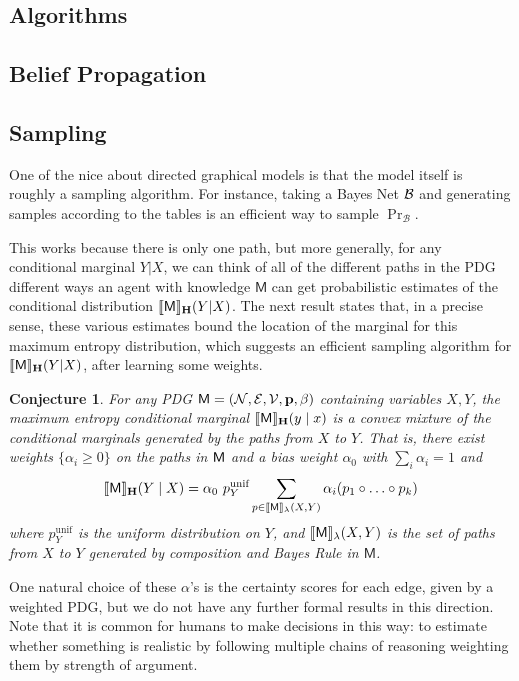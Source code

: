 \documentclass{article}
\theoremstyle{plain}
\newtheorem{conj}[theorem]{Conjecture}
\theoremstyle{definition}
\theoremstyle{remark}
\DeclarePairedDelimiter{\bbr}{\llbracket}{\rrbracket}
\newcommand\MaxEnt{_{\mathbf H}}
\newcommand{\sfM}{\mathsf M}
\newcommand{\MN}{PDG}
\numberwithin{equation}{section}
\begin{document}
	\begin{vfull}
	\section{Algorithms}\label{sec:algorithms}
	\subsection{Belief Propagation}
	
	
	\subsection{Sampling}
	
	One of the nice about directed graphical models is that the model itself is roughly a sampling algorithm. For instance, taking a Bayes Net $\cal B$ and generating samples according to the tables is an efficient way to sample $\Pr_{\mathcal B}$.

	This works because there is only one path, but more generally, for any conditional marginal $Y|X$, we can think of all of the different paths in the PDG different ways an agent with knowledge $\sfM$ can get probabilistic estimates of the conditional distribution $\bbr{\sfM}\MaxEnt(Y | X)$. The next result states that, in a precise sense, these various estimates bound the location of the marginal for this maximum entropy distribution, which suggests an efficient sampling algorithm for $\bbr{\sfM}\MaxEnt(Y | X)$, after learning some weights.
	
	\begin{conj}\label{thm:maxent-hull}
		For any PDG $\sfM = \mnvars[]$ containing variables $X, Y$, the maximum entropy conditional marginal $\bbr{\sfM}\MaxEnt(y \mid x)$ is a convex mixture of the conditional marginals generated by the paths from $X$ to $Y$.  That is, there exist weights $\{\alpha_i \geq 0\}$ on the paths in $\sf M$ and a bias weight $\alpha_0$ with $\sum_i {\alpha_i} = 1$ and
		\[ \bbr{\sfM}\MaxEnt(Y \mid X) = \alpha_0 \  p^{\text{unif}}_Y \sum_{p \in \bbr{\sfM}_\lambda(X, Y)} \alpha_i (p_1 \circ \ldots \circ p_k) \]
		where $p^{\text{unif}}_Y$ is the uniform distribution on $Y$, and $\bbr{\sfM}_\lambda(X,Y)$ is the set of paths from $X$ to $Y$ generated by composition and Bayes Rule in $\sfM$. 
	\end{conj}

	One natural choice of these $\alpha$'s is the certainty scores for each edge, given by a weighted \MN, but we do not have any further formal results in this direction.
	Note that it is common for humans to make decisions in this way: to estimate whether something is realistic by following multiple chains of reasoning weighting them by strength of argument.
	
	\end{vfull}
\end{document}
